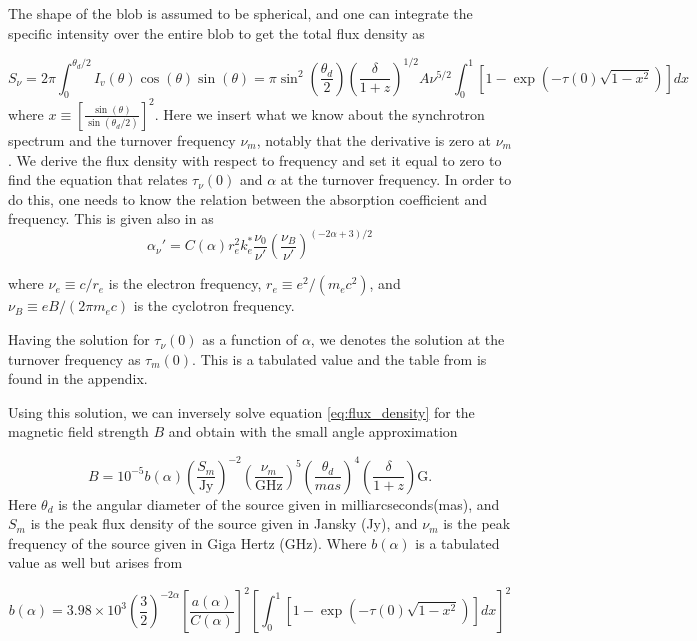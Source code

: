 The shape of the blob is assumed to be spherical, and one can integrate the specific intensity over the entire blob to get the total flux density as

\begin{equation}
    \label{eq:flux_density}
    S_\nu = 2\pi \int_0^{\theta_d/2} I_v(\theta)\cos(\theta)\sin(\theta) = \pi \sin^2(\frac{\theta_d}{2})(\frac{\delta}{1+z})^{1/2}A \nu^{5/2} \int_0^1[1-\exp(-\tau(0)\sqrt{1-x^2})]dx
\end{equation}
where $x \equiv \left[\frac{\sin(\theta)}{\sin(\theta_d/2)}\right]^2$.
Here we insert what we know about the synchrotron spectrum and the turnover frequency $\nu_m$, notably that the derivative is zero at $\nu_m$. We derive the flux density with respect to frequency and set it equal to zero to find the equation that relates $\tau_\nu(0)$ and $\alpha$ at the turnover frequency. In order to do this, one needs to know the relation between the absorption coefficient and frequency. This is given also in \cite{Hirotani_2005} as 
\begin{equation}
    \alpha_\nu' = C(\alpha) r_e^2 k_e^*\frac{\nu_0}{\nu'}(\frac{\nu_B}{\nu'})^{(-2\alpha +3)/2}
\end{equation} 

where $\nu_e \equiv c/r_e$ is the electron frequency, $r_e \equiv e^2/(m_e c^2)$, and  
$\nu_B \equiv eB/(2\pi m_e c)$ is the cyclotron frequency. 

Having the solution for $\tau_\nu(0)$ as a function of $\alpha$, we denotes the solution at the turnover frequency as $\tau_m(0)$. This is a tabulated value and the table from \cite{Hirotani_2005} is found in the appendix.

Using this solution, we can inversely solve equation \ref{eq:flux_density} for the magnetic field strength $B$ and obtain with the small angle approximation 

\begin{equation}
    B =   10^{-5} b(\alpha) \left(\frac{S_m}{\text{Jy}}\right)^{-2}\left(\frac{\nu_m}{\text{GHz}}\right)^{5}\left(\frac{\theta_d}{mas}\right)^{4}\left(\frac{\delta}{1+z}\right) \text{G}.
\end{equation}
Here $\theta_d$ is the angular diameter of the source given in milliarcseconds(mas), and $S_m$ is the peak flux density of the source given in Jansky (Jy), and $\nu_m$ is the peak frequency of the source given in Giga Hertz (GHz). 
Where $b(\alpha)$ is a tabulated value as well but arises from 

\begin{equation}
    b(\alpha) = 3.98 \times 10^{3} \left(\frac{3}{2}\right)^{-2\alpha} \left[\frac{a(\alpha)}{C(\alpha)}\right]^{2} \left[\int_0^1[1-\exp(-\tau(0)\sqrt{1-x^2})]dx\right]^2
\end{equation}




